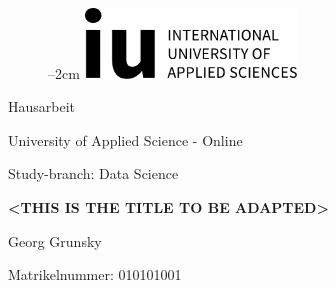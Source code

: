 
\label{titlePage}
\begin{figure}[h]
\centering
\advance\leftskip--2cm
\includegraphics[width=0.50\textwidth]{pics/logo.pdf}
\end{figure}
\FloatBarrier

\begin{Large} 
\begin{center}
Hausarbeit
\end{center}
\end{Large} 

\vspace*{5mm}

\begin{large} 
\begin{center}
University of Applied Science - Online
\end{center}
\end{large} 

\begin{large} 
\begin{center}
Study-branch: Data Science
\end{center}
\end{large}

\vspace*{15mm}

\begin{Large} 
\begin{center}
\textbf{<THIS IS THE TITLE TO BE ADAPTED>}
\end{center}
\end{Large}

\vspace*{15mm}

\begin{large} 
\begin{center}
Georg Grunsky
\end{center}
\end{large} 

\vspace*{-6mm}

\begin{large} 
\begin{center}
Matrikelnummer: 010101001
\end{center}
\end{large} 

